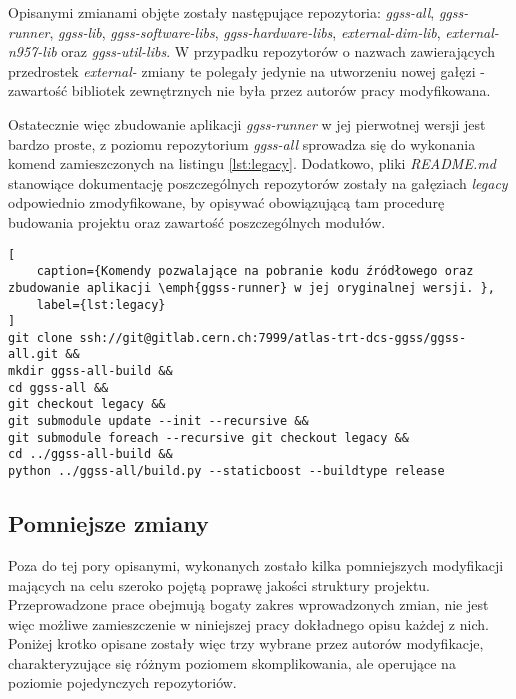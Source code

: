 Opisanymi zmianami objęte zostały następujące repozytoria: \emph{ggss-all}, \emph{ggss-runner}, \emph{ggss-lib}, \emph{ggss-software-libs}, \emph{ggss-hardware-libs}, \emph{external-dim-lib}, \emph{external-n957-lib} oraz \emph{ggss-util-libs}. W przypadku repozytorów o nazwach zawierających przedrostek \emph{external-} zmiany te polegały jedynie na utworzeniu nowej gałęzi - zawartość bibliotek zewnętrznych nie była przez autorów pracy modyfikowana.

Ostatecznie więc zbudowanie aplikacji \emph{ggss-runner} w jej pierwotnej wersji jest bardzo proste, z poziomu repozytorium \emph{ggss-all} sprowadza się do wykonania komend zamieszczonych na listingu \ref{lst:legacy}. Dodatkowo, pliki \emph{README.md} stanowiące dokumentację poszczególnych repozytorów zostały na gałęziach \emph{legacy} odpowiednio zmodyfikowane, by opisywać obowiązującą tam procedurę budowania projektu oraz zawartość poszczególnych modułów.

\begin{lstlisting}[
    caption={Komendy pozwalające na pobranie kodu źródłowego oraz zbudowanie aplikacji \emph{ggss-runner} w jej oryginalnej wersji. },
    label={lst:legacy}
]
git clone ssh://git@gitlab.cern.ch:7999/atlas-trt-dcs-ggss/ggss-all.git &&
mkdir ggss-all-build &&
cd ggss-all &&
git checkout legacy &&
git submodule update --init --recursive &&
git submodule foreach --recursive git checkout legacy &&
cd ../ggss-all-build &&
python ../ggss-all/build.py --staticboost --buildtype release
\end{lstlisting}

\subsection{Pomniejsze zmiany}
Poza do tej pory opisanymi, wykonanych zostało kilka pomniejszych modyfikacji mających na celu szeroko pojętą poprawę jakości struktury projektu. Przeprowadzone prace obejmują bogaty zakres wprowadzonych zmian, nie jest więc możliwe zamieszczenie w niniejszej pracy dokładnego opisu każdej z nich. Poniżej krotko opisane zostały więc trzy wybrane przez autorów modyfikacje, charakteryzujące się różnym poziomem skomplikowania, ale operujące na poziomie pojedynczych repozytoriów. 

